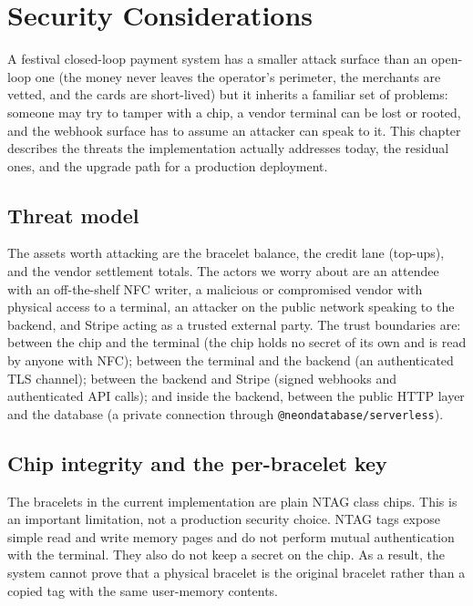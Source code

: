 \chapter{Security Considerations}
\label{chap:security}

A festival closed-loop payment system has a smaller attack surface than an open-loop one (the money never leaves the operator's perimeter, the merchants are vetted, and the cards are short-lived) but it inherits a familiar set of problems: someone may try to tamper with a chip, a vendor terminal can be lost or rooted, and the webhook surface has to assume an attacker can speak to it. This chapter describes the threats the implementation actually addresses today, the residual ones, and the upgrade path for a production deployment.

\section{Threat model}
\label{sec:threat-model}

The assets worth attacking are the bracelet balance, the credit lane (top-ups), and the vendor settlement totals. The actors we worry about are an attendee with an off-the-shelf NFC writer, a malicious or compromised vendor with physical access to a terminal, an attacker on the public network speaking to the backend, and Stripe acting as a trusted external party. The trust boundaries are: between the chip and the terminal (the chip holds no secret of its own and is read by anyone with NFC); between the terminal and the backend (an authenticated TLS channel); between the backend and Stripe (signed webhooks and authenticated API calls); and inside the backend, between the public HTTP layer and the database (a private connection through \texttt{@neondatabase/serverless}).

\section{Chip integrity and the per-bracelet key}
\label{sec:chip-integrity}

The bracelets in the current implementation are plain NTAG class chips. This is an important limitation, not a production security choice. NTAG tags expose simple read and write memory pages and do not perform mutual authentication with the terminal. They also do not keep a secret on the chip. As a result, the system cannot prove that a physical bracelet is the original bracelet rather than a copied tag with the same user-memory contents.

